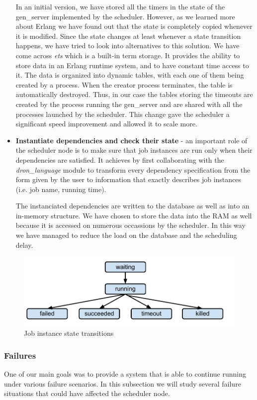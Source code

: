 \documentclass[11pt,a4paper,twoside]{report}
\begin{document}
\begin{itemize}
In an initial version, we have stored all the timers in the state of the gen\_server implemented by the scheduler. However, as we learned more about Erlang we have found out that the state is completely copied whenever it is modified. Since the state changes at least whenever a state transition happens, we have tried to look into alternatives to this solution. We have come across \textit{ets} which is a built-in term storage. It provides the ability to store data in an Erlang runtime system, and to have constant time access to it. The data is organized into dynamic tables, with each one of them being created by a process. When the creator process terminates, the table is automatically destroyed. Thus, in our case the tables storing the timeouts are created by the process running the gen\_server and are shared with all the processes launched by the scheduler. This change gave the scheduler a significant speed improvement and allowed it to scale more.
\item{}
\textbf{Instantiate dependencies and check their state} - an important role of the scheduler node is to make sure that job instances are run only  when their dependencies are satisfied. It achieves by first collaborating with the \textit{dron\_language} module to transform every dependency specification from the form given by the user to information that exactly describes job instances (i.e. job name, running time).


The instanciated dependencies are written to the database as well as into an in-memory structure. We have chosen to store the data into the RAM as well because it is accessed on numerous occassions by the scheduler. In this way we have managed to reduce the load on the database and the scheduling delay.
\end{itemize}


\begin{figure}[h]
\centering
\includegraphics[scale=0.85]{JobStates}
\caption{Job instance state transitions}
\label{fig:JobStates}
\end{figure}


\subsubsection{Failures}
One of our main goals was to provide a system that is able to continue running under various failure scenarios. In this subsection we will study several failure situations that could have affected the scheduler node.
\end{document}
